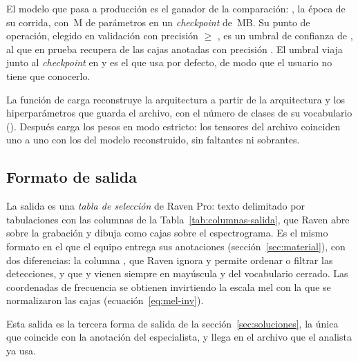 El modelo que pasa a producción es el ganador de la comparación: \rWinnerRun{},
la época \rFinalEpoch{} de su corrida, con \cParamsYol{}\,M de parámetros en un
\textit{checkpoint} de \rFinalMb{}\,MB. Su punto de operación, elegido en
validación con precisión $\geq$ \pMinPrecision{}, es un umbral de confianza de
\rFinalThreshold{}, al que en prueba recupera \rRecallYol{} de las cajas
anotadas con precisión \rPrecisionYol{}. El umbral viaja junto al
\textit{checkpoint} en  y es el que 
usa por defecto, de modo que el usuario no tiene que conocerlo.

 La función de carga reconstruye la
arquitectura a partir de la arquitectura y los hiperparámetros que guarda el
archivo, con el número de clases de su vocabulario (\rFinalClasses{}). Después
carga los pesos en modo estricto: los \rFinalTensors{} tensores del archivo
coinciden uno a uno con los del modelo reconstruido, sin faltantes ni
sobrantes.

\subsection{Formato de salida}
\label{sec:formato-salida}

La salida es una \emph{tabla de selección} de Raven Pro: texto delimitado por
tabulaciones con las \rDemoColumns{} columnas de la Tabla~\ref{tab:columnas-salida}, que
Raven abre sobre la grabación y dibuja como cajas sobre el espectrograma. Es el
mismo formato en el que el equipo entrega sus anotaciones
(sección~\ref{sec:material}), con dos diferencias: la columna , que
Raven ignora y permite ordenar o filtrar las detecciones, y que  y
 vienen siempre en mayúscula y del vocabulario cerrado. Las
coordenadas de frecuencia se obtienen invirtiendo la escala mel con la que se
normalizaron las cajas (ecuación~\ref{eq:mel-inv}).

Esta salida es la tercera forma de salida de la
sección~\ref{sec:soluciones}, la única que coincide con la
anotación del especialista, y llega en el archivo que el analista ya usa.

